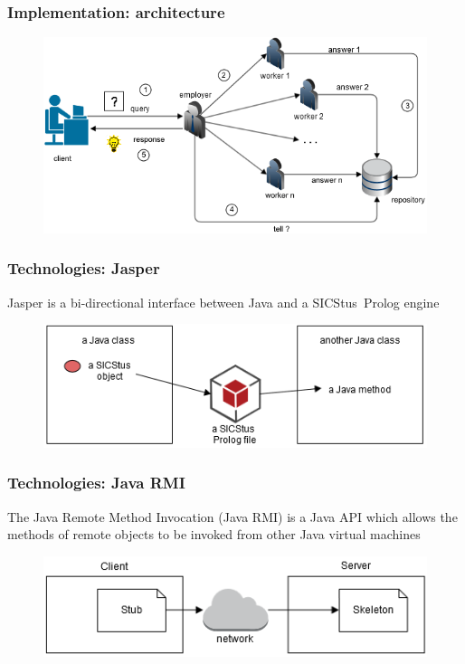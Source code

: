 \documentclass[serif,mathserif]{beamer}
\begin{document}
\begin{frame}
	\frametitle{Implementation: architecture}
	\begin{figure}[htp]
\centering
\includegraphics[scale=0.66]{img/DIAG_1.png}
\end{figure}
\end{frame}

\begin{frame}
	\frametitle{Technologies: Jasper}
	
	Jasper is a bi-directional interface between Java and a SICStus~Prolog engine
	\begin{figure}[H]
	\centering
	\includegraphics[scale=0.66]{img/jasper.png}
	\end{figure}
\end{frame}

\begin{frame}
	\frametitle{Technologies: Java RMI}
	
	The Java Remote Method Invocation (Java RMI) is a Java API which allows the methods of remote  objects to be invoked from other Java virtual machines
	\begin{figure}[H]
	\centering
	\includegraphics[scale=0.66]{img/rmi.png}
	\end{figure}

\end{frame}
\end{document}
